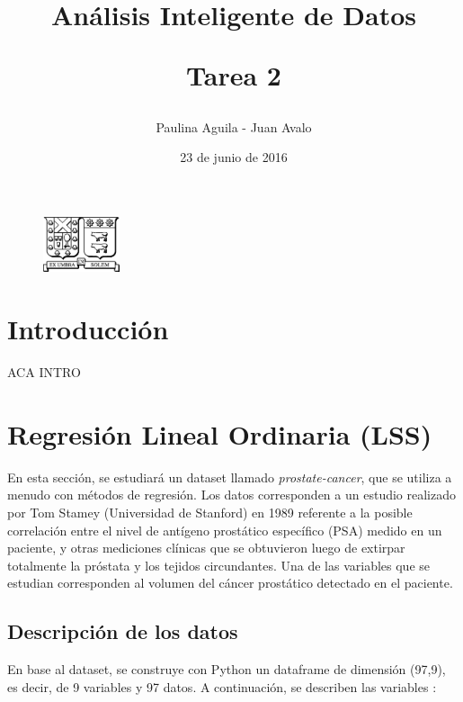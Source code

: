 \documentclass[letter, 10pt]{article}
\begin{document}
\title{Análisis Inteligente de Datos \\ \begin{Large}Tarea 2\end{Large}}
\author{Paulina Aguila - Juan Avalo}
\date{23 de junio de 2016}

\maketitle


\begin{figure}[ht]
\begin{center}
\includegraphics[width=0.2\textwidth]{Images/Isotipo-Negro.png}\\
\end{center}
\end{figure}
\vspace{2cm}
\section{Introducci\'on}
ACA INTRO

\section{Regresión Lineal Ordinaria (LSS)}

En esta sección, se estudiará un dataset llamado \textit{prostate-cancer}\cite{D}, que se utiliza a menudo con métodos de regresión. Los datos corresponden a un estudio realizado por Tom Stamey (Universidad de Stanford) en 1989 referente a la posible correlación entre el nivel de antígeno prostático específico (PSA) medido en un paciente, y otras mediciones clínicas que se obtuvieron luego de extirpar totalmente la próstata y los tejidos circundantes. Una de las variables que se estudian corresponden al volumen del cáncer prostático detectado en el paciente.

\subsection{Descripción de los datos}
En base al dataset, se construye con Python un dataframe de dimensión (97,9), es decir, de 9 variables y 97 datos. A continuación, se describen las variables \cite{DD}:
\end{document}

